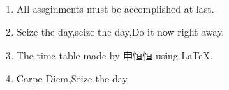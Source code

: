 \documentclass[landscape,a4paper]{article}
\begin{document}
\begin{CJK}{UTF8}{gbsn}
\begin{calendar}{\hsize}
 
\finishCalendar
\end{calendar}
\\

\begin{enumerate}

\item All assginments must be accomplished at last.
\item Seize the day,seize the day,Do it now right away.
\item The time table made by 申恒恒 using \LaTeX{}.
\item Carpe Diem,Seize the day.

\end{enumerate}
\end{CJK}
\end{document}
